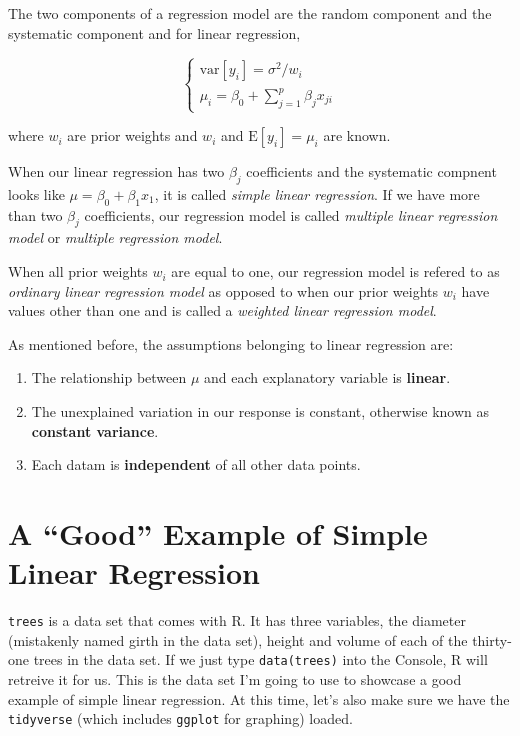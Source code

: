 \documentclass[
]{book}
\providecommand{\tightlist}{%
  \setlength{\itemsep}{0pt}\setlength{\parskip}{0pt}}
\begin{document}
The two components of a regression model are the random component and the systematic component and for linear regression,

\[
\begin{cases}
  \text{var}[y_i] = \sigma^2/w_i \\
  \mu_i = \beta_0 + \sum_{j=1}^{p}\beta_jx_{ji}
\end{cases}
\]

where \(w_i\) are prior weights and \(w_i\) and \(\text{E}[y_i] = \mu_i\) are known.

When our linear regression has two \(\beta_j\) coefficients and the systematic compnent looks like \(\mu = \beta_0 + \beta_1x_1\), it is called \emph{simple linear regression}. If we have more than two \(\beta_j\) coefficients, our regression model is called \emph{multiple linear regression model} or \emph{multiple regression model}.

When all prior weights \(w_i\) are equal to one, our regression model is refered to as \emph{ordinary linear regression model} as opposed to when our prior weights \(w_i\) have values other than one and is called a \emph{weighted linear regression model}.

As mentioned before, the assumptions belonging to linear regression are:

\begin{enumerate}
\def\labelenumi{\arabic{enumi}.}
\tightlist
\item
  The relationship between \(\mu\) and each explanatory variable is \textbf{linear}.
\item
  The unexplained variation in our response is constant, otherwise known as \textbf{constant variance}.
\item
  Each datam is \textbf{independent} of all other data points.
\end{enumerate}

\hypertarget{a-good-example-of-simple-linear-regression}{%
\section{A ``Good'' Example of Simple Linear Regression}\label{a-good-example-of-simple-linear-regression}}

\texttt{trees} is a data set that comes with R. It has three variables, the diameter (mistakenly named girth in the data set), height and volume of each of the thirty-one trees in the data set. If we just type \texttt{data(trees)} into the Console, R will retreive it for us. This is the data set I'm going to use to showcase a good example of simple linear regression. At this time, let's also make sure we have the \texttt{tidyverse} (which includes \texttt{ggplot} for graphing) loaded.
\end{document}
